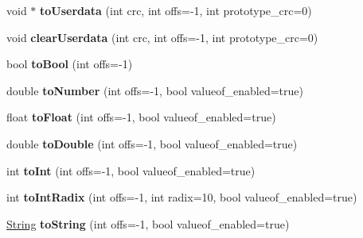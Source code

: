 \begin{DoxyCompactItemize}
\item 
void $\ast$ {\bfseries to\+Userdata} (int crc, int offs=-\/1, int prototype\+\_\+crc=0)\hypertarget{class_object_script_1_1_o_s_a173a9fe9bf1b102cced0a6ce3db107f1}{}\label{class_object_script_1_1_o_s_a173a9fe9bf1b102cced0a6ce3db107f1}

\item 
void {\bfseries clear\+Userdata} (int crc, int offs=-\/1, int prototype\+\_\+crc=0)\hypertarget{class_object_script_1_1_o_s_aeae93b0b45b27286caecda67011377ce}{}\label{class_object_script_1_1_o_s_aeae93b0b45b27286caecda67011377ce}

\item 
bool {\bfseries to\+Bool} (int offs=-\/1)\hypertarget{class_object_script_1_1_o_s_af78c76e2836e2f1d0bd41204ee28f6de}{}\label{class_object_script_1_1_o_s_af78c76e2836e2f1d0bd41204ee28f6de}

\item 
double {\bfseries to\+Number} (int offs=-\/1, bool valueof\+\_\+enabled=true)\hypertarget{class_object_script_1_1_o_s_a58d296bfe5c17af205242ba90ca08548}{}\label{class_object_script_1_1_o_s_a58d296bfe5c17af205242ba90ca08548}

\item 
float {\bfseries to\+Float} (int offs=-\/1, bool valueof\+\_\+enabled=true)\hypertarget{class_object_script_1_1_o_s_a1873459e92631f9e8c7f94cd88991e03}{}\label{class_object_script_1_1_o_s_a1873459e92631f9e8c7f94cd88991e03}

\item 
double {\bfseries to\+Double} (int offs=-\/1, bool valueof\+\_\+enabled=true)\hypertarget{class_object_script_1_1_o_s_aeeda2200c611cc5d3331691d41bda91e}{}\label{class_object_script_1_1_o_s_aeeda2200c611cc5d3331691d41bda91e}

\item 
int {\bfseries to\+Int} (int offs=-\/1, bool valueof\+\_\+enabled=true)\hypertarget{class_object_script_1_1_o_s_a912f70c22f7d0b2d541bd5be7b32b5b5}{}\label{class_object_script_1_1_o_s_a912f70c22f7d0b2d541bd5be7b32b5b5}

\item 
int {\bfseries to\+Int\+Radix} (int offs=-\/1, int radix=10, bool valueof\+\_\+enabled=true)\hypertarget{class_object_script_1_1_o_s_a28b6eb9d426fee67c86bcbbaed8019d4}{}\label{class_object_script_1_1_o_s_a28b6eb9d426fee67c86bcbbaed8019d4}

\item 
\hyperlink{class_object_script_1_1_o_s_1_1_string}{String} {\bfseries to\+String} (int offs=-\/1, bool valueof\+\_\+enabled=true)\hypertarget{class_object_script_1_1_o_s_ab4fa8adeda8939b76b31fb656760966f}{}\label{class_object_script_1_1_o_s_ab4fa8adeda8939b76b31fb656760966f}


\end{DoxyCompactItemize}
